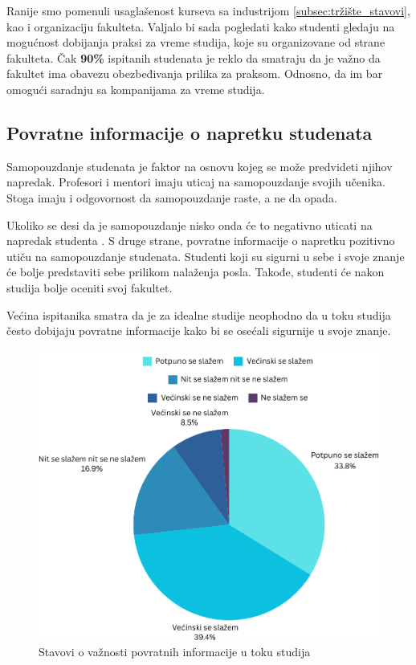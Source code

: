 \documentclass[a4paper]{article}
\begin{document}
{Ranije smo pomenuli usaglašenost kurseva sa industrijom \ref{subsec:tržište_stavovi}, kao i organizaciju fakulteta. Valjalo bi sada pogledati kako studenti gledaju na mogućnost dobijanja praksi za vreme studija, koje su organizovane od strane fakulteta. Čak \textbf{90\%} ispitanih studenata je reklo da smatraju da je važno da fakultet ima obavezu obezbeđivanja prilika za praksom. Odnosno, da im bar omogući saradnju sa kompanijama za vreme studija.

\subsection{Povratne informacije o napretku studenata}
\label{subsec:povrane_informacije}

Samopouzdanje studenata je faktor na osnovu kojeg se može predvideti njihov napredak\cite{correlation}.
Profesori i mentori imaju uticaj na samopouzdanje svojih učenika. Stoga imaju i odgovornost da samopouzdanje raste, a ne da opada.

Ukoliko se desi da je samopouzdanje nisko onda će to negativno uticati na napredak studenta \cite{confidence}. S druge strane, povratne informacije o napretku pozitivno utiču na samopouzdanje studenata. Studenti koji su sigurni u sebe i svoje znanje će bolje predstaviti sebe prilikom nalaženja posla. Takođe, studenti će nakon studija bolje oceniti svoj fakultet. 

Većina ispitanika smatra da je za idealne studije neophodno da u toku studija često dobijaju povratne informacije kako bi se osećali sigurnije u svoje znanje. 
\begin{figure}[h!]
\begin{center}
    \includegraphics[scale = 0.3]{PieChartPovratneInformacije.png}
    \caption{Stavovi o važnosti povratnih informacije u toku studija}
    \label{fig:povratne_informacije}
\end{center}
\end{figure}

}
\end{document}
